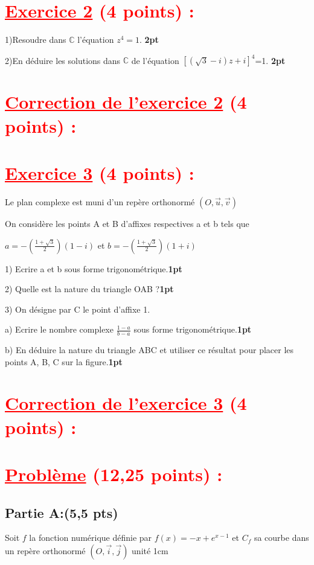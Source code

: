 \documentclass[12pt]{article}
\begin{document}
\section*{\textcolor{red}{\underline{Exercice 2} (4 points) :}}
1)Resoudre dans $\mathbb{C}$ l'équation $z^{4}=1$. \textbf{2pt}

2)En déduire les solutions dans $\mathbb{C}$ de l'équation $\left[\left(\sqrt{3}-i\right)z+i  \right]^{4}$=1. \textbf{2pt}
\section*{\textcolor{red}{\underline{Correction de l'exercice 2} (4 points) :}}
\section*{\textcolor{red}{\underline{Exercice 3} (4 points) :}}
Le plan complexe est muni d’un repère orthonormé $(O,\vec{u},\vec{v})$

On considère les points A et B d’affixes respectives a et b tels que

$a=-(\frac{1+\sqrt{3}}{2})(1-i)$ et $b=-(\frac{1+\sqrt{3}}{2})(1+i)$ 

1) Ecrire a et b sous forme trigonométrique.\textbf{1pt}

2) Quelle est la nature du triangle OAB ?\textbf{1pt}

3) On désigne par C le point d’affixe 1.

a) Ecrire le nombre complexe $\frac{1-a}{b-a}$  sous forme trigonométrique.\textbf{1pt}

b) En déduire la nature du triangle ABC et  utiliser ce résultat pour placer les points A, B, C sur la figure.\textbf{1pt}
\section*{\textcolor{red}{\underline{Correction de l'exercice 3} (4 points) :}}
\section*{\textcolor{red}{\underline{Problème} (12,25 points) :}}
\subsection*{Partie A:(5,5 pts)}
Soit $f$ la fonction numérique définie par $f(x)=-x+e^{x-1}$  et $C_{f}$ sa courbe dans un repère orthonormé $(O,\vec{i},\vec{j})$ unité 1cm
\end{document}

